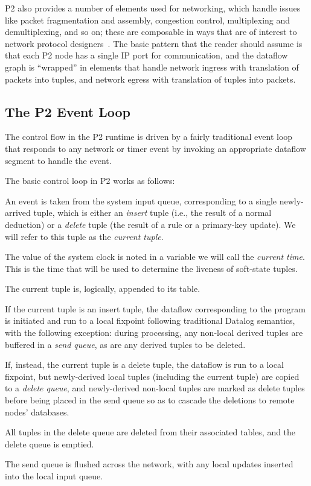 P2 also provides a number of elements used for networking, which handle issues
like packet fragmentation and assembly, congestion control, multiplexing and
demultiplexing, and so on; these are composable in ways that are of interest to
network protocol designers~\cite{condie-hotnets05}.  The basic pattern that the
reader should assume is that each P2 node has a single IP port for
communication, and the dataflow graph is ``wrapped'' in elements that handle
network ingress with translation of packets into tuples, and network egress
with translation of tuples into packets.

\subsection{The P2 Event Loop}
\label{sec:eventloop}

The control flow in the P2 runtime is driven by a fairly traditional event loop
that responds to any network or timer event by invoking an appropriate dataflow
segment to handle the event.

The basic control loop in P2 works as follows:
\begin{CompactEnumerate}
    \item An event is taken from the system input queue, corresponding to a single newly-arrived tuple, which is either an {\em insert} tuple (i.e., the result of a normal deduction) or a {\em delete} tuple (the result of a  rule or a primary-key update).  We will refer to this tuple as the {\em current tuple}.
    \item The value of the system clock is noted in a variable we will call the {\em current time}.  This is the time that will be used to determine the liveness of soft-state tuples.  
    \item The current tuple is, logically, appended to its table.
    \item If the current tuple is an insert tuple, the dataflow corresponding to the \OVERLOG program is initiated and run to a local fixpoint following traditional Datalog semantics, with the following exception: during processing, any non-local derived tuples are buffered in a {\em send queue}, as are any derived tuples to be deleted.
    \item If, instead, the current tuple is a delete tuple, the dataflow
    is run to a local fixpoint, but newly-derived local tuples
    (including the current tuple) are copied to a {\em delete queue},
    and newly-derived non-local tuples are marked as delete tuples
    before being placed in the send queue so as to cascade the deletions
    to remote nodes' databases.
    \item All tuples in the delete queue are deleted from their associated tables, and the delete queue is emptied.
    \item The send queue is flushed across the network, with any local updates inserted into the local input queue.
\end{CompactEnumerate}

